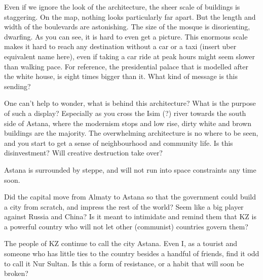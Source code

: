 \documentclass{article}
\begin{document}
Even if we ignore the look of the architecture, the sheer scale of buildings is staggering. On the map, nothing looks particularly far apart. But the length and width of the boulevards are astonishing. The size of the mosque is disorienting, dwarfing. As you can see, it is hard to even get a picture. 
This enormous scale makes it hard to reach any destination without a car or a taxi (insert uber equivalent name here), even if taking a car ride at peak hours might seem slower than walking pace. 
For reference, the presidential palace that is modelled after the white house, is eight times bigger than it. What kind of message is this sending? 

One can't help to wonder, what is behind this architecture? What is the purpose of such a display? Especially as you cross the Isim (?) river towards the south side of Astana, where the modernism stops and low rise, dirty white and brown buildings are the majority. The overwhelming architecture is no where to be seen, and you start to get a sense of neighbourhood and community life. Is this disinvestment? Will creative destruction take over?

Astana is surrounded by steppe, and will not run into space constraints any time soon. 

Did the capital move from Almaty to Astana so that the government could build a city from scratch, and impress the rest of the world? Seem like a big player against Russia and China? Is it meant to intimidate and remind them that KZ is a powerful country who will not let other (communist) countries govern them? 


The people of KZ continue to call the city Astana. Even I, as a tourist and someone who has little ties to the country besides a handful of friends, find it odd to call it Nur Sultan. Is this a form of resistance, or a habit that will soon be broken?

\pagebreak

\printbibliography
\end{document}
